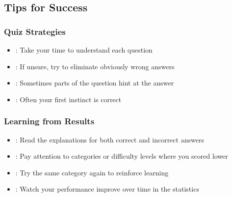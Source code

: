 \documentclass[letterpaper,10pt,english]{sphinxmanual}
\begin{document}
\subsection{Tips for Success}
\label{\detokenize{user_guide:tips-for-success}}

\subsubsection{Quiz Strategies}
\label{\detokenize{user_guide:quiz-strategies}}\begin{itemize}
\item {} 
\sphinxAtStartPar
{}: Take your time to understand each question

\item {} 
\sphinxAtStartPar
{}: If unsure, try to eliminate obviously wrong answers

\item {} 
\sphinxAtStartPar
{}: Sometimes parts of the question hint at the answer

\item {} 
\sphinxAtStartPar
{}: Often your first instinct is correct

\end{itemize}


\subsubsection{Learning from Results}
\label{\detokenize{user_guide:learning-from-results}}\begin{itemize}
\item {} 
\sphinxAtStartPar
{}: Read the explanations for both correct and incorrect answers

\item {} 
\sphinxAtStartPar
{}: Pay attention to categories or difficulty levels where you scored lower

\item {} 
\sphinxAtStartPar
{}: Try the same category again to reinforce learning

\item {} 
\sphinxAtStartPar
{}: Watch your performance improve over time in the statistics

\end{itemize}
\end{document}
